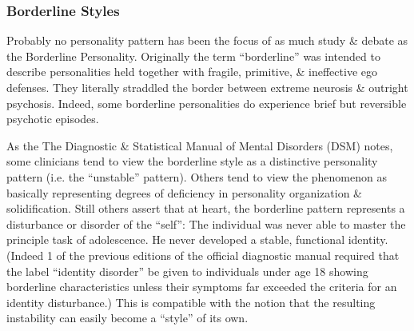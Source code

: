 \documentclass{article}
\numberwithin{equation}{section}
\begin{document}
\subsubsection{Borderline Styles}
Probably no personality pattern has been the focus of as much study \& debate as the Borderline Personality. Originally the term ``borderline'' was intended to describe personalities held together with fragile, primitive, \& ineffective ego defenses. They literally straddled the border between extreme neurosis \& outright psychosis. Indeed, some borderline personalities do experience brief but reversible psychotic episodes.

As the The Diagnostic \& Statistical Manual of Mental Disorders (DSM) notes, some clinicians tend to view the borderline style as a distinctive personality pattern (i.e. the ``unstable'' pattern). Others tend to view the phenomenon as basically representing degrees of deficiency in personality organization \& solidification. Still others assert that at heart, the borderline pattern represents a disturbance or disorder of the ``self'': The individual was never able to master the principle task of adolescence. He never developed a stable, functional identity. (Indeed 1 of the previous editions of the official diagnostic manual required that the label ``identity disorder'' be given to individuals under age 18 showing borderline characteristics unless their symptoms far exceeded the criteria for an identity disturbance.) This is compatible with the notion that the resulting instability can easily become a ``style'' of its own.
\end{document}
